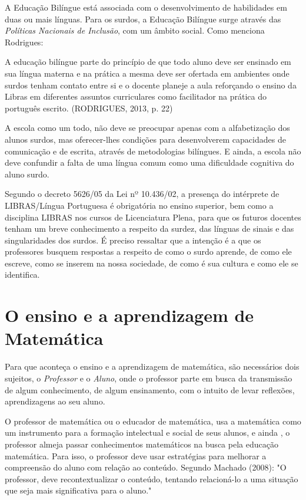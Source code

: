 \documentclass[brasil]{abnt}
\begin{document}
	A Educação Bilíngue está associada com o desenvolvimento de habilidades em duas ou mais línguas. Para os surdos, a Educação Bilíngue surge através das \textit{Políticas Nacionais de Inclusão}, com um âmbito social.
	Como menciona Rodrigues:
	
		\begin{citacao} A educação bilíngue parte do princípio de que todo aluno deve ser ensinado em sua língua materna e na prática a mesma deve ser ofertada em ambientes onde surdos tenham contato entre si e o 
						docente planeje a aula reforçando o ensino da Libras em diferentes assuntos curriculares como facilitador na prática do português escrito. (RODRIGUES, 2013, p. 22) 
		\end{citacao}

	A escola como um todo, não deve se preocupar apenas com a alfabetização dos alunos surdos, mas oferecer-lhes condições para desenvolverem capacidades de comunicação e de escrita, através de 
	metodologias bilíngues.	E ainda, a escola não deve confundir a falta de uma língua comum como uma dificuldade cognitiva do aluno surdo. 
	
	Segundo o decreto 5626/05 da Lei nº 10.436/02, a presença do intérprete de LIBRAS/Língua Portuguesa é obrigatória no ensino superior, bem como a disciplina LIBRAS nos cursos de Licenciatura Plena,
	para que os futuros docentes tenham um breve conhecimento a respeito da surdez, das línguas de sinais e das singularidades dos surdos. É preciso ressaltar que a intenção é a que os professores busquem
	respostas a respeito de como o surdo aprende, de como ele escreve, como se inserem na nossa sociedade, de como é sua cultura e como ele se identifica.
	 
											
\chapter{O ensino e a aprendizagem de Matemática}
    Para que aconteça o ensino e a aprendizagem de matemática, são necessários dois sujeitos, o \textit{Professor} e o \textit{Aluno}, onde o professor parte em busca da transmissão de algum conhecimento, 
    de algum ensinamento, com o intuito de levar reflexões, aprendizagens ao seu aluno.
    
    O professor de matemática ou o educador de matemática, usa a matemática como um instrumento para a formação intelectual e social de seus alunos, e ainda , o professor almeja passar conhecimentos 
    matemáticos na busca pela educação matemática. Para isso, o professor deve usar estratégias para melhorar a compreensão do aluno com relação ao conteúdo. Segundo Machado (2008): "O professor, deve 
    recontextualizar o conteúdo, tentando relacioná-lo a uma situação que seja mais significativa para o aluno."
    
\end{document}
